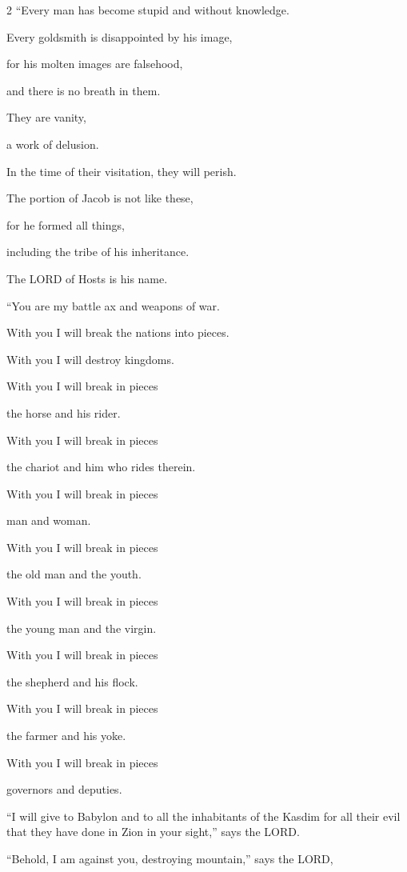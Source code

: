 \begin{multicols}{2}
\myverse{}“Every man has become stupid and without knowledge.

Every goldsmith is disappointed by his image,

for his molten images are falsehood,

and there is no breath in them.


\myverse{}They are vanity,

a work of delusion.

In the time of their visitation, they will perish.


\myverse{}The portion of Jacob is not like these,

for he formed all things,

including the tribe of his inheritance.

The LORD of Hosts is his name.

\vspace{\baselineskip}

\myverse{}“You are my battle ax and weapons of war.

With you I will break the nations into pieces.

With you I will destroy kingdoms.


\myverse{}With you I will break in pieces

the horse and his rider.


\myverse{}With you I will break in pieces

the chariot and him who rides therein.

With you I will break in pieces

man and woman.

With you I will break in pieces

the old man and the youth.

With you I will break in pieces

the young man and the virgin.


\myverse{}With you I will break in pieces

the shepherd and his flock.

With you I will break in pieces

the farmer and his yoke.

With you I will break in pieces

governors and deputies.


\myverse{}“I will give to Babylon and to all the inhabitants of the Kasdim for all their evil
that they have done in Zion in your sight,” says the LORD.


\myverse{}“Behold, I am against you, destroying mountain,” says the LORD,


\end{multicols}

